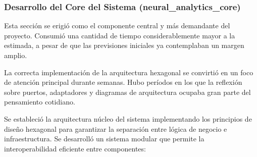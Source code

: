 \subsubsection{Desarrollo del Core del Sistema (neural\_analytics\_core)}

Esta sección se erigió como el componente central y más demandante del proyecto. Consumió una cantidad de tiempo considerablemente mayor a la estimada, a pesar de que las previsiones iniciales ya contemplaban un margen amplio.

La correcta implementación de la arquitectura hexagonal se convirtió en un foco de atención principal durante semanas. Hubo períodos en los que la reflexión sobre puertos, adaptadores y diagramas de arquitectura ocupaba gran parte del pensamiento cotidiano.

Se estableció la arquitectura núcleo del sistema implementando los principios de diseño hexagonal para garantizar la separación entre lógica de negocio e infraestructura. Se desarrolló un sistema modular que permite la interoperabilidad eficiente entre componentes:

